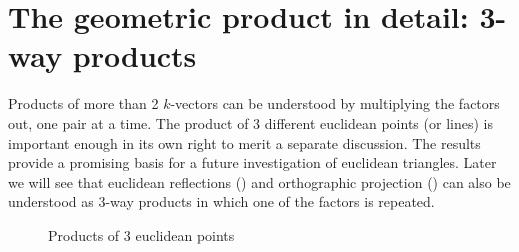 \documentclass{birkjour}
\begin{document}
 \section{The geometric product in detail: 3-way products}
\label{sec:threes}
Products of more than 2 $k$-vectors can be understood by multiplying the factors out, one pair at a time.  The product of 3 different euclidean points (or lines) is important enough in its own right to merit a separate discussion. The results provide a promising basis for  a future investigation of euclidean triangles.  Later we will see that euclidean reflections () and orthographic projection () can also be understood as 3-way products in which one of the factors is repeated.

  \begin{figure}
   \centering
{\setlength\fboxsep{0pt}}\hspace{.03in}
\caption{Products of 3 euclidean points}
\label{fig:trianglepts}
\end{figure}

\end{document}
